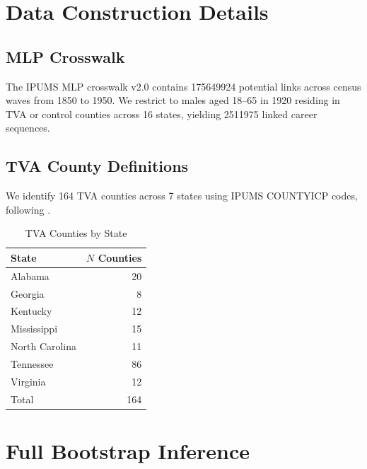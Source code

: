 \documentclass[12pt]{article}
\begin{document}
\section{Data Construction Details}
\label{app:data}

\subsection{MLP Crosswalk}

The IPUMS MLP crosswalk v2.0 contains \num{175649924} potential links across census waves from 1850 to 1950. We restrict to males aged 18--65 in 1920 residing in TVA or control counties across 16 states, yielding \num{2511975} linked career sequences.

\subsection{TVA County Definitions}

We identify 164 TVA counties across 7 states using IPUMS COUNTYICP codes, following \citet{kline2014}.

\begin{table}[H]
\centering
\caption{TVA Counties by State}
\label{tab:tva_counties}
\begin{tabular}{lr}
\toprule
State & $N$ Counties \\
\midrule
Alabama & 20 \\
Georgia & 8 \\
Kentucky & 12 \\
Mississippi & 15 \\
North Carolina & 11 \\
Tennessee & 86 \\
Virginia & 12 \\
\midrule
Total & 164 \\
\bottomrule
\end{tabular}
\end{table}


\section{Full Bootstrap Inference}
\label{app:bootstrap}
\end{document}
